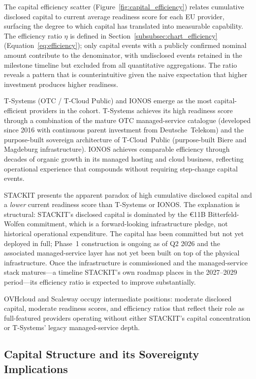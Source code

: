 The capital efficiency scatter (Figure~\ref{fig:capital_efficiency}) relates cumulative disclosed capital to current average readiness score for each EU provider, surfacing the degree to which capital has translated into measurable capability. The efficiency ratio $\eta$ is defined in Section~\ref{subsubsec:chart_efficiency} (Equation~\ref{eq:efficiency}); only capital events with a publicly confirmed nominal amount contribute to the denominator, with undisclosed events retained in the milestone timeline but excluded from all quantitative aggregations. The ratio reveals a pattern that is counterintuitive given the naive expectation that higher investment produces higher readiness.

T-Systems (OTC / T-Cloud Public) and IONOS emerge as the most capital-efficient providers in the cohort. T-Systems achieves its high readiness score through a combination of the mature OTC managed-service catalogue (developed since 2016 with continuous parent investment from Deutsche~Telekom) and the purpose-built sovereign architecture of T-Cloud~Public (purpose-built Biere and Magdeburg infrastructure). IONOS achieves comparable efficiency through decades of organic growth in its managed hosting and cloud business, reflecting operational experience that compounds without requiring step-change capital events.

STACKIT presents the apparent paradox of high cumulative disclosed capital and a \emph{lower} current readiness score than T-Systems or IONOS. The explanation is structural: STACKIT's disclosed capital is dominated by the €11B Bitterfeld-Wolfen commitment, which is a forward-looking infrastructure pledge, not historical operational expenditure. The capital has been committed but not yet deployed in full; Phase~1 construction is ongoing as of Q2 2026 and the associated managed-service layer has not yet been built on top of the physical infrastructure. Once the infrastructure is commissioned and the managed-service stack matures---a timeline STACKIT's own roadmap places in the 2027--2029 period---its efficiency ratio is expected to improve substantially.

OVHcloud and Scaleway occupy intermediate positions: moderate disclosed capital, moderate readiness scores, and efficiency ratios that reflect their role as full-featured providers operating without either STACKIT's capital concentration or T-Systems' legacy managed-service depth.

\subsection{Capital Structure and its Sovereignty Implications}
\label{subsec:capital_structure}

